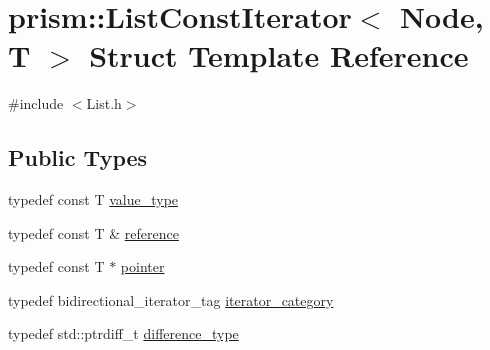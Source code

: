 \hypertarget{structprism_1_1_list_const_iterator}{}\section{prism\+:\+:List\+Const\+Iterator$<$ Node, T $>$ Struct Template Reference}
\label{structprism_1_1_list_const_iterator}


{\ttfamily \#include $<$List.\+h$>$}

\subsection*{Public Types}
\begin{DoxyCompactItemize}
\item 
typedef const T \hyperlink{structprism_1_1_list_const_iterator_adfd43e41c11c067d81279589a424b5a2}{value\+\_\+type}
\item 
typedef const T \& \hyperlink{structprism_1_1_list_const_iterator_ad35238dd195319f3f07c12769b52b472}{reference}
\item 
typedef const T $\ast$ \hyperlink{structprism_1_1_list_const_iterator_a1c92e5a7b7d0a92c744027ca421cb651}{pointer}
\item 
typedef bidirectional\+\_\+iterator\+\_\+tag \hyperlink{structprism_1_1_list_const_iterator_a6cf9898af1bc61457d9f8331a95bb1fa}{iterator\+\_\+category}
\item 
typedef std\+::ptrdiff\+\_\+t \hyperlink{structprism_1_1_list_const_iterator_a16d9c896e7353dc34db8cd8e0edbf40d}{difference\+\_\+type}
\end{DoxyCompactItemize}
